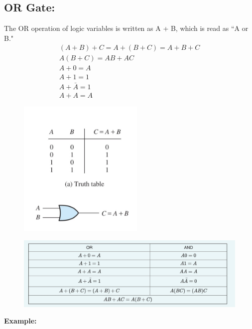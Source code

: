 \documentclass[a4paper,12]{article}
\begin{document}
     \subsection{OR Gate:}
     The OR operation of logic variables is written as A + B, which is read as ``A or B."
     \begin{gather}
         (A+B)+C=A+(B+C)=A+B+C\\
         A(B+C)=AB+AC\\
         A+0=A\\
         A+1=1\\
         A+\bar{A}=1\\
         A+A=A
     \end{gather}
     \begin{figure}[H]
         \centering
         \includegraphics[width=60mm]{Image/37.jpg}
     \end{figure}
     \begin{figure}[H]
         \centering
         \includegraphics[width=150mm]{Image/39.jpg}
     \end{figure}
     \cleardoublepage
     \textbf{Example:}
\end{document}
